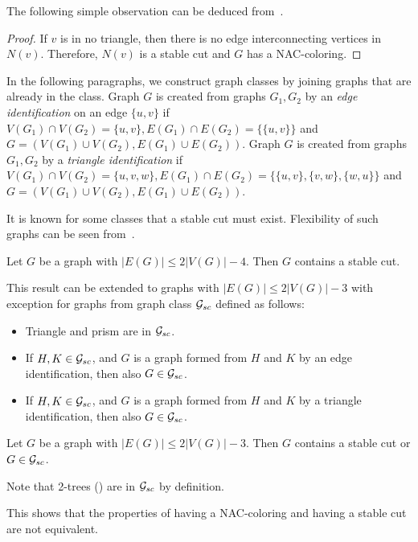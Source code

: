 The following simple observation can be deduced
from~.
%
%
\begin{proof}
	If \( v \) is in no triangle, then there is no edge interconnecting
	vertices in \( N(v) \). Therefore, \( N(v) \) is a stable cut and \( G \)
	has a NAC-coloring.
\end{proof}

In the following paragraphs, we construct graph classes by joining graphs
that are already in the class.
Graph \( G \) is created from graphs \( G_1, G_2 \) by an \emph{edge identification}
on an edge \( \{u, v\} \)
if \( V(G_1) \cap V(G_2) = \{u, v\}, E(G_1) \cap E(G_2) = \{\{u, v\}\} \)
and \( G = (V(G_1) \cup V(G_2), E(G_1) \cup E(G_2)) \).
Graph \( G \) is created from graphs \( G_1, G_2 \) by a \emph{triangle identification}
if \( V(G_1) \cap V(G_2) = \{u, v, w\}, E(G_1) \cap E(G_2) = \{\{u, v\}, \{v, w\}, \{w, u\}\} \)
and \( G = (V(G_1) \cup V(G_2), E(G_1) \cup E(G_2)) \).

It is known for some classes that a stable cut must exist.
Flexibility of such graphs can be seen from~.
%
\begin{theorem}
	Let \( G \) be a graph with \( |E(G)| \le 2|V(G)|-4 \).
	Then \( G \) contains a stable cut.
\end{theorem}
%
This result can be extended to graphs with \( |E(G)| \le 2|V(G)|-3 \) with exception
for graphs from graph class \( \mathcal{G}_{sc} \) defined as follows:
%
\begin{itemize}
	\item Triangle and prism are in \( \mathcal{G}_{sc} \).
	\item If \( H, K \in \mathcal{G}_{sc} \), and \( G \) is a graph
	      formed from \( H \) and \( K \) by an edge identification,
	      then also \( G \in \mathcal{G}_{sc} \).
	\item If \( H, K \in \mathcal{G}_{sc} \), and \( G \) is a graph
	      formed from \( H \) and \( K \) by a triangle identification,
	      then also \( G \in \mathcal{G}_{sc} \).
\end{itemize}
%
%
\begin{theorem}
	Let \( G \) be a graph with \( |E(G)| \le 2|V(G)|-3 \). Then \( G \) contains
	a stable cut or \( G \in \mathcal{G}_{sc} \).
\end{theorem}
%
Note that 2-trees ()
are in \( \mathcal{G}_{sc} \) by definition.
%
%
This shows that the properties of having a NAC-coloring and having a stable cut
are not equivalent.

